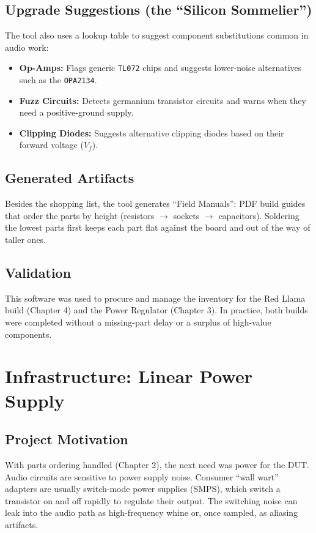 \documentclass[11pt, a4paper]{report}
\begin{document}
\section{Upgrade Suggestions (the ``Silicon Sommelier'')}
The tool also uses a lookup table to suggest component substitutions common in audio work:
\begin{itemize}
  \item \textbf{Op-Amps:} Flags generic \texttt{TL072} chips and suggests lower-noise alternatives such as the \texttt{OPA2134}.\cite{ti_tl072_datasheet,ti_opa2134_datasheet}
  \item \textbf{Fuzz Circuits:} Detects germanium transistor circuits and warns when they need a positive-ground supply.\cite{amplifiedparts_positive_ground,electrosmash_germanium_fuzz}
  \item \textbf{Clipping Diodes:} Suggests alternative clipping diodes based on their forward voltage ($V_f$).\cite{guitarpedalx_clipping_diodes}
\end{itemize}

\section{Generated Artifacts}
Besides the shopping list, the tool generates ``Field Manuals'': PDF build guides that order the parts by height (resistors $\to$ sockets $\to$ capacitors). Soldering the lowest parts first keeps each part flat against the board and out of the way of taller ones.

\section{Validation}
This software was used to procure and manage the inventory for the Red Llama build (Chapter 4) and the Power Regulator (Chapter 3). In practice, both builds were completed without a missing-part delay or a surplus of high-value components.

\chapter{Infrastructure: Linear Power Supply}

\section{Project Motivation}
With parts ordering handled (Chapter 2), the next need was power for the DUT. Audio circuits are sensitive to power supply noise. Consumer ``wall wart'' adapters are usually switch-mode power supplies (SMPS), which switch a transistor on and off rapidly to regulate their output. The switching noise can leak into the audio path as high-frequency whine or, once sampled, as aliasing artifacts.\cite{ti_an1950_lownoise_smps}
\end{document}
